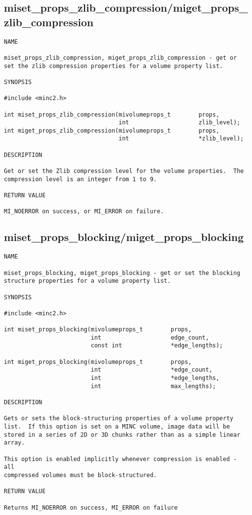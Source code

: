 \documentclass{article}
\begin{document}
\subsection{miset\_props\_zlib\_compression/miget\_props\_zlib\_compression}
\begin{verbatim}
NAME 

miset_props_zlib_compression, miget_props_zlib_compression - get or
set the zlib compression properties for a volume property list.

SYNOPSIS

#include <minc2.h>

int miset_props_zlib_compression(mivolumeprops_t        props, 
                                 int                    zlib_level);
int miget_props_zlib_compression(mivolumeprops_t        props, 
                                 int                    *zlib_level);

DESCRIPTION

Get or set the Zlib compression level for the volume properties.  The 
compression level is an integer from 1 to 9.

RETURN VALUE

MI_NOERROR on success, or MI_ERROR on failure.
\end{verbatim}

\subsection{miset\_props\_blocking/miget\_props\_blocking}
\begin{verbatim}
NAME

miset_props_blocking, miget_props_blocking - get or set the blocking 
structure properties for a volume property list.

SYNOPSIS

#include <minc2.h>

int miset_props_blocking(mivolumeprops_t        props, 
                         int                    edge_count,
                         const int              *edge_lengths);

int miget_props_blocking(mivolumeprops_t        props, 
                         int                    *edge_count, 
                         int                    *edge_lengths, 
                         int                    max_lengths);

DESCRIPTION

Gets or sets the block-structuring properties of a volume property
list.  If this option is set on a MINC volume, image data will be
stored in a series of 2D or 3D chunks rather than as a simple linear
array.

This option is enabled implicitly whenever compression is enabled - all
compressed volumes must be block-structured.

RETURN VALUE

Returns MI_NOERROR on success, MI_ERROR on failure
\end{verbatim}
\end{document}
